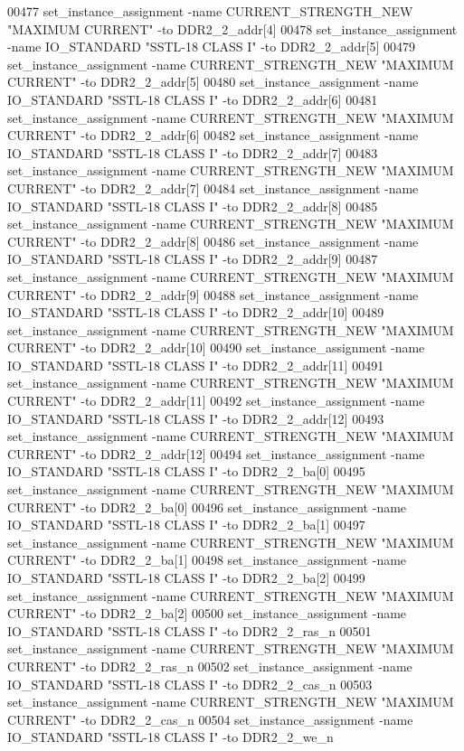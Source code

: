 \begin{DoxyCode}
00477 set\_instance\_assignment -name CURRENT\_STRENGTH\_NEW "MAXIMUM CURRENT" -to DDR2\_2\_addr[4]
00478 set\_instance\_assignment -name IO\_STANDARD "SSTL-18 CLASS I" -to DDR2\_2\_addr[5]
00479 set\_instance\_assignment -name CURRENT\_STRENGTH\_NEW "MAXIMUM CURRENT" -to DDR2\_2\_addr[5]
00480 set\_instance\_assignment -name IO\_STANDARD "SSTL-18 CLASS I" -to DDR2\_2\_addr[6]
00481 set\_instance\_assignment -name CURRENT\_STRENGTH\_NEW "MAXIMUM CURRENT" -to DDR2\_2\_addr[6]
00482 set\_instance\_assignment -name IO\_STANDARD "SSTL-18 CLASS I" -to DDR2\_2\_addr[7]
00483 set\_instance\_assignment -name CURRENT\_STRENGTH\_NEW "MAXIMUM CURRENT" -to DDR2\_2\_addr[7]
00484 set\_instance\_assignment -name IO\_STANDARD "SSTL-18 CLASS I" -to DDR2\_2\_addr[8]
00485 set\_instance\_assignment -name CURRENT\_STRENGTH\_NEW "MAXIMUM CURRENT" -to DDR2\_2\_addr[8]
00486 set\_instance\_assignment -name IO\_STANDARD "SSTL-18 CLASS I" -to DDR2\_2\_addr[9]
00487 set\_instance\_assignment -name CURRENT\_STRENGTH\_NEW "MAXIMUM CURRENT" -to DDR2\_2\_addr[9]
00488 set\_instance\_assignment -name IO\_STANDARD "SSTL-18 CLASS I" -to DDR2\_2\_addr[10]
00489 set\_instance\_assignment -name CURRENT\_STRENGTH\_NEW "MAXIMUM CURRENT" -to DDR2\_2\_addr[10]
00490 set\_instance\_assignment -name IO\_STANDARD "SSTL-18 CLASS I" -to DDR2\_2\_addr[11]
00491 set\_instance\_assignment -name CURRENT\_STRENGTH\_NEW "MAXIMUM CURRENT" -to DDR2\_2\_addr[11]
00492 set\_instance\_assignment -name IO\_STANDARD "SSTL-18 CLASS I" -to DDR2\_2\_addr[12]
00493 set\_instance\_assignment -name CURRENT\_STRENGTH\_NEW "MAXIMUM CURRENT" -to DDR2\_2\_addr[12]
00494 set\_instance\_assignment -name IO\_STANDARD "SSTL-18 CLASS I" -to DDR2\_2\_ba[0]
00495 set\_instance\_assignment -name CURRENT\_STRENGTH\_NEW "MAXIMUM CURRENT" -to DDR2\_2\_ba[0]
00496 set\_instance\_assignment -name IO\_STANDARD "SSTL-18 CLASS I" -to DDR2\_2\_ba[1]
00497 set\_instance\_assignment -name CURRENT\_STRENGTH\_NEW "MAXIMUM CURRENT" -to DDR2\_2\_ba[1]
00498 set\_instance\_assignment -name IO\_STANDARD "SSTL-18 CLASS I" -to DDR2\_2\_ba[2]
00499 set\_instance\_assignment -name CURRENT\_STRENGTH\_NEW "MAXIMUM CURRENT" -to DDR2\_2\_ba[2]
00500 set\_instance\_assignment -name IO\_STANDARD "SSTL-18 CLASS I" -to DDR2\_2\_ras\_n
00501 set\_instance\_assignment -name CURRENT\_STRENGTH\_NEW "MAXIMUM CURRENT" -to DDR2\_2\_ras\_n
00502 set\_instance\_assignment -name IO\_STANDARD "SSTL-18 CLASS I" -to DDR2\_2\_cas\_n
00503 set\_instance\_assignment -name CURRENT\_STRENGTH\_NEW "MAXIMUM CURRENT" -to DDR2\_2\_cas\_n
00504 set\_instance\_assignment -name IO\_STANDARD "SSTL-18 CLASS I" -to DDR2\_2\_we\_n

\end{DoxyCode}
